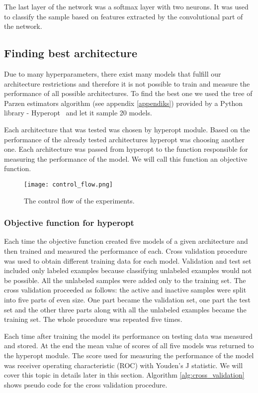 \documentclass[a4paper,10pt]{report}
\begin{document}
      The last layer of the network was a softmax layer with two neurons. It was used to classify the sample based on features extracted by the convolutional part of the network. 
      
	\subsection{Finding best architecture}
	Due to many hyperparameters, there exist many models that fulfill our architecture restrictions and therefore it is not possible to train and measure the performance of all possible architectures. To find the best one we used the tree of Parzen estimators algorithm (see appendix \ref{appendiks}) provided by a Python library - Hyperopt~\cite{HYPEROPT} and let it sample 20 models. 
		
	Each architecture that was tested was chosen by hyperopt module. Based on the performance of the already tested architectures hyperopt was choosing another one. Each architecture was passed from hyperopt to the function responsible for measuring the performance of the model. We will call this function an objective function. 
	
	 \begin{figure}[h!]
	  \centering
	  \texttt{[image: control\_flow.png]}
	  \caption{The control flow of the experiments.}
	  \label{fig:control_flow}
	\end{figure} 
	
	\subsubsection{Objective function for hyperopt}
	Each time the objective function created five models of a given architecture and then trained and measured the performance of each. Cross validation procedure was used to obtain different training data for each model. Validation and test set included only labeled examples because classifying unlabeled examples would not be possible. All the unlabeled samples were added only to the training set. The cross validation proceeded as follows: the active and inactive samples were split into five parts of even size. One part became the validation set, one part the test set and the other three parts along with all the unlabeled examples became the training set. The whole procedure was repeated five times. 
	
	Each time after training the model its performance on testing data was measured and stored. At the end the mean value of scores of all five models was returned to the hyperopt module. The score used for measuring the performance of the model was receiver operating characteristic (ROC) with Youden's J statistic. We will cover this topic in details later in this section. Algorithm \ref{alg:cross_validation} shows pseudo code for the cross validation procedure. 
	
\end{document}
